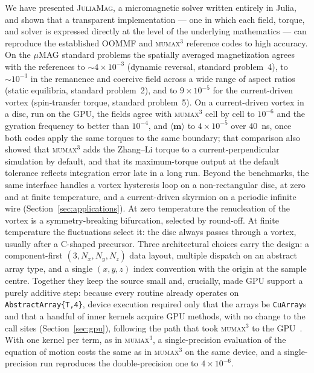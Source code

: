 \documentclass{article}      %
\newcommand{\JuliaMag}{\textsc{JuliaMag}}
\newcommand{\mumax}{\textsc{mumax}$^3$}
\newcommand{\oommf}{\textsc{OOMMF}}
\newcommand{\vm}{\bm{m}}
\begin{document}
We have presented \JuliaMag, a micromagnetic solver written entirely in Julia,
and shown that a transparent implementation --- one in which each field, torque,
and solver is expressed directly at the level of the underlying mathematics ---
can reproduce the established \oommf{} and \mumax{} reference codes to high
accuracy. On the $\mu$MAG standard problems the spatially averaged magnetization
agrees with the references to $\sim 4\times10^{-3}$ (dynamic reversal, standard
problem~4), to $\sim 10^{-3}$ in the remanence and coercive field across a wide
range of aspect ratios (static equilibria, standard problem~2), and to
$9\times10^{-5}$ for the current-driven vortex (spin-transfer torque, standard
problem~5). On a current-driven vortex in a disc, run on the GPU, the
fields agree with \mumax{} cell by cell to $10^{-6}$ and the gyration frequency
to better than $10^{-4}$, and $\langle\vm\rangle$ to $4\times10^{-5}$ over
$40$~ns, once both codes apply the same torques to the same boundary; that
comparison also showed that \mumax{} adds the Zhang--Li torque to a
current-perpendicular simulation by default, and that its maximum-torque output
at the default tolerance reflects integration error late in a long run.
Beyond the benchmarks, the same interface handles a vortex hysteresis
loop on a non-rectangular disc, at zero and at finite temperature, and a
current-driven skyrmion on a periodic infinite wire
(Section~\ref{sec:applications}). At zero temperature the renucleation of the
vortex is a symmetry-breaking bifurcation, selected by round-off. At finite
temperature the fluctuations select it: the disc always passes through a vortex,
usually after a C-shaped precursor. Three architectural choices carry
the design: a
component-first $(3,N_x,N_y,N_z)$ data layout, multiple dispatch on an abstract
array type, and a single $(x,y,z)$ index convention with the origin at the sample
centre. Together they keep the source small and, crucially, made GPU support
a purely additive step: because every routine already operates on
\texttt{AbstractArray\{T,4\}}, device execution required only that the arrays be
\texttt{CuArray}s and that a handful of inner kernels acquire GPU methods, with no
change to the call sites (Section~\ref{sec:gpu}), following the path that took
\mumax{} to the GPU~\cite{lopezdiaz2012}. With one kernel per term, as in \mumax{},
a single-precision evaluation of the equation of motion costs the same as in
\mumax{} on the same device, and a single-precision run reproduces the
double-precision one to $4\times10^{-6}$.
\end{document}
